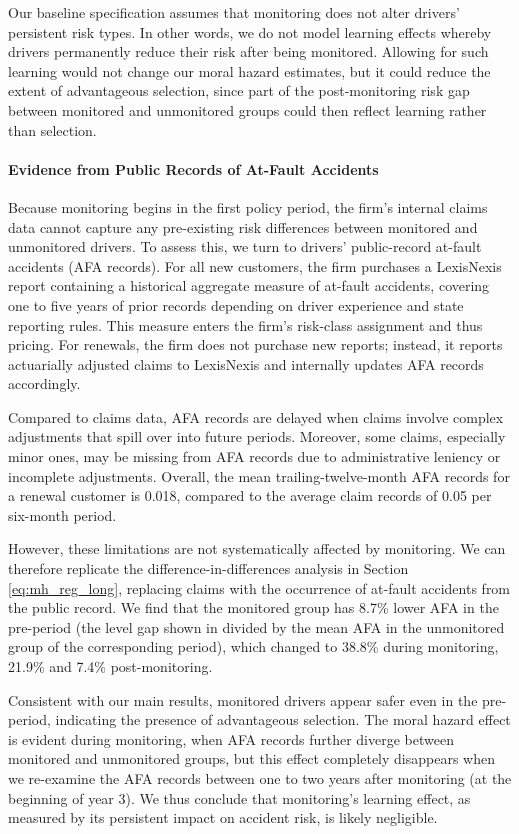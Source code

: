Our baseline specification assumes that monitoring does not alter drivers' persistent risk types. In other words, we do not model learning effects whereby drivers permanently reduce their risk after being monitored. Allowing for such learning would not change our moral hazard estimates, but it could reduce the extent of advantageous selection, since part of the post-monitoring risk gap between monitored and unmonitored groups could then reflect learning rather than selection.

\paragraph{Evidence from Public Records of At-Fault Accidents}

Because monitoring begins in the first policy period, the firm's internal claims data cannot capture any pre-existing risk differences between monitored and unmonitored drivers. To assess this, we turn to drivers' public-record at-fault accidents (AFA records). For all new customers, the firm purchases a LexisNexis report containing a historical aggregate measure of at-fault accidents, covering one to five years of prior records depending on driver experience and state reporting rules. This measure enters the firm's risk-class assignment and thus pricing. For renewals, the firm does not purchase new reports; instead, it reports actuarially adjusted claims to LexisNexis and internally updates AFA records accordingly.

Compared to claims data, AFA records are delayed when claims involve complex adjustments that spill over into future periods. Moreover, some claims, especially minor ones, may be missing from AFA records due to administrative leniency or incomplete adjustments. Overall, the mean trailing-twelve-month AFA records for a renewal customer is 0.018, compared to the average claim records of 0.05 per six-month period.

However, these limitations are not systematically affected by monitoring. We can therefore replicate the difference-in-differences analysis in Section \ref{eq:mh_reg_long}, replacing claims with the occurrence of at-fault accidents from the public record. We find that the monitored group has 8.7\% lower AFA in the pre-period (the level gap shown in  divided by the mean AFA in the unmonitored group of the corresponding period), which changed to 38.8\% during monitoring, 21.9\% and 7.4\% post-monitoring.

Consistent with our main results, monitored drivers appear safer even in the pre-period, indicating the presence of advantageous selection. The moral hazard effect is evident during monitoring, when AFA records further diverge between monitored and unmonitored groups, but this effect completely disappears when we re-examine the AFA records between one to two years after monitoring (at the beginning of year 3). We thus conclude that monitoring's learning effect, as measured by its persistent impact on accident risk, is likely negligible.

